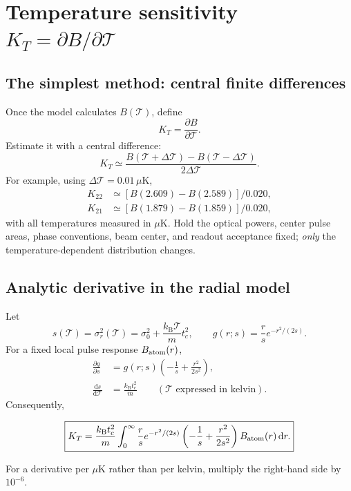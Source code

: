 \documentclass[11pt,a4paper]{article}
\numberwithin{equation}{section}
\newcommand{\Tat}{\mathcal{T}}
\newcommand{\kb}{k_{\mathrm B}}
\newcommand{\dd}{\mathrm{d}}
\begin{document}
\section{Temperature sensitivity $K_T=\partial B/\partial\Tat$}

\subsection{The simplest method: central finite differences}

Once the model calculates $B(\Tat)$, define
\begin{equation}\label{eq:KT}
\boxed{K_T=\frac{\partial B}{\partial\Tat}.}
\end{equation}
Estimate it with a central difference:
\begin{equation}\label{eq:KTdiff}
\boxed{K_T\simeq\frac{B(\Tat+\Delta\Tat)-B(\Tat-\Delta\Tat)}{2\Delta\Tat}.}
\end{equation}
For example, using $\Delta\Tat=0.01\,\mu\mathrm K$,
\begin{align}
K_{22}&\simeq[B(2.609)-B(2.589)]/0.020,\\
K_{21}&\simeq[B(1.879)-B(1.859)]/0.020,
\end{align}
with all temperatures measured in $\mu$K. Hold the optical powers, center
pulse areas, phase conventions, beam center, and readout acceptance fixed;
\emph{only} the temperature-dependent distribution changes.

\subsection{Analytic derivative in the radial model}

Let
\begin{equation}
 s(\Tat)=\sigma_r^2(\Tat)=\sigma_0^2+\frac{\kb\Tat}{m}t_c^2,
 \qquad g(r;s)=\frac r{s}e^{-r^2/(2s)}.
\end{equation}
For a fixed local pulse response $B_{\rm atom}(r)$,
\begin{align}
\frac{\partial g}{\partial s}
 &=g(r;s)\left(-\frac1s+\frac{r^2}{2s^2}\right),\\
\frac{\dd s}{\dd\Tat}&=\frac{\kb t_c^2}{m}
 \qquad(\Tat\text{ expressed in kelvin}).
\end{align}
Consequently,
\begin{keybox}
\begin{equation}\label{eq:KTanalytic}
\boxed{K_T=\frac{\kb t_c^2}{m}
 \int_0^\infty\frac r{s}e^{-r^2/(2s)}
 \left(-\frac1s+\frac{r^2}{2s^2}\right)
 B_{\rm atom}(r)\,\dd r.}
\end{equation}
\end{keybox}
For a derivative per $\mu$K rather than per kelvin, multiply the right-hand
side by $10^{-6}$.
\end{document}
